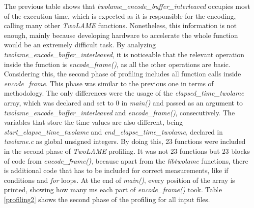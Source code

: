 The previous table shows that \textit{twolame\_encode\_buffer\_interleaved} occupies most of the execution time, which is expected as it is responsible for the encoding, calling many other \textit{TwoLAME} functions. Nonetheless, this information is not enough, mainly because developing hardware to accelerate the whole function would be an extremely difficult task.
By analyzing \textit{twolame\_encode\_buffer\_interleaved}, it is noticeable that the relevant operation inside the function is \textit{encode\_frame()}, as all the other operations are basic.
Considering this, the second phase of profiling includes all function calls inside \textit{encode\_frame}. 
This phase was similar to the previous one in terms of methodology. The only differences were the usage of the \textit{elapsed\_time\_twolame} array, which was declared and set to 0 in \textit{main()} and passed as an argument to \textit{twolame\_encode\_buffer\_interleaved} and \textit{encode\_frame()}, consecutively. The variables that store the time values are also different, being \textit{start\_elapse\_time\_twolame} and \textit{end\_elapse\_time\_twolame}, declared in \textit{twolame.c} as global unsigned integers.
By doing this, 23 functions were included in the second phase of \textit{TwoLAME} profiling. It was not 23 functions but 23 blocks of code from \textit{encode\_frame()}, because apart from the \textit{libtwolame} functions, there is additional code that has to be included for correct measurements, like if conditions and \textit{for} loops.
At the end of \textit{main()}, every position of the array is printed, showing how many ms each part of \textit{encode\_frame()} took. 
Table \ref{profiling2} shows the second phase of the profiling for all input files.

